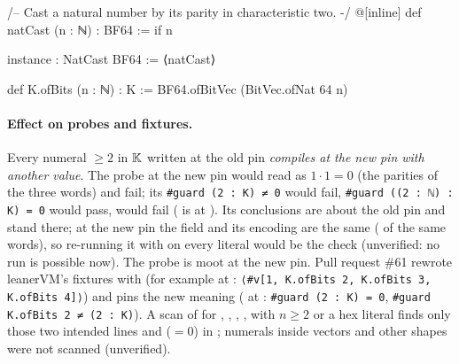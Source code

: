 \begin{leancode}
/-- Cast a natural number by its parity in characteristic two. -/
@[inline] def natCast (n : ℕ) : BF64 := if n %

instance : NatCast BF64 := ⟨natCast⟩
\end{leancode}



\begin{leancode}
def K.ofBits (n : ℕ) : K := BF64.ofBitVec (BitVec.ofNat 64 n)
\end{leancode}


\paragraph{Effect on probes and fixtures.} Every numeral $\geq 2$ in $\mathbb{K}$ written at the old pin
\emph{compiles at the new pin with another value}. The probe  at the new pin
would read  as
$1 \cdot 1 = 0$ (the parities of the three words) and fail; its \texttt{\#guard (2 : K) ≠ 0} would
fail, \texttt{\#guard ((2 : ℕ) : K) = 0} would pass,  would fail ( is
 at ). Its conclusions are about the old pin and stand there;
at the new pin the field and its encoding are the same ( of the same words), so
re-running it with  on every literal would be the check (unverified: no run is
possible now). The probe  is moot at the new pin. Pull request \#61 rewrote
leanerVM's fixtures with  (for example \allowbreak{}\allowbreak{}\allowbreak{}
at : \texttt{⟨\#v[1, K.ofBits 2, K.ofBits 3, K.ofBits 4]⟩}) and pins the new meaning
(\allowbreak{}\allowbreak{}\allowbreak{} at : \texttt{\#guard (2 : K) = 0},
\texttt{\#guard K.ofBits 2 ≠ (2 : K)}). A scan of  for , ,
, ,  with $n \geq 2$ or a hex literal finds only
those two intended lines and  ($= 0$) in
\allowbreak{}\allowbreak{}\allowbreak{}; numerals inside vectors and other shapes
were not scanned (unverified).

